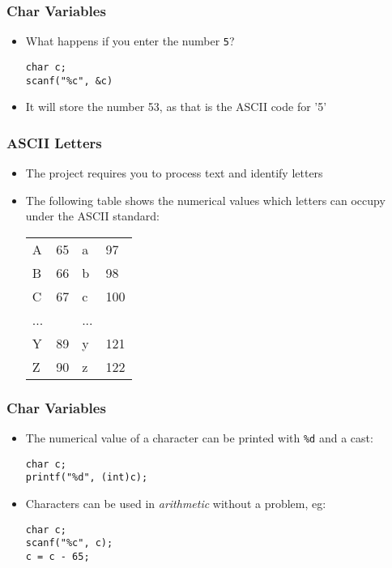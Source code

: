 \documentclass[14pt]{beamer}
\begin{document}
\begin{frame}[fragile]
\frametitle{Char Variables}
\begin{itemize}
\item What happens if you enter the number \texttt{5}?
\begin{lstlisting}[style=CStyle]
char c;
scanf("%c", &c)
\end{lstlisting}
\pause
\item It will store the number 53, as that is the ASCII code for '5'
\end{itemize}
\end{frame}

\begin{frame}
\frametitle{ASCII Letters}
\begin{itemize}
\item The project requires you to process text and identify letters
\item The following table shows the numerical values which letters can occupy under the ASCII standard:

\begin{table}[H]
\begin{center}
\begin{tabular}{ll|ll}
A & 65 & a & 97\\
B & 66 & b & 98\\
C & 67 & c & 100\\
... & & ... & \\
Y & 89 & y & 121\\
Z & 90 & z & 122
\end{tabular}
\end{center}
\end{table}
\end{itemize}
\end{frame}

\begin{frame}[fragile]
\frametitle{Char Variables}
\begin{itemize}
\item The numerical value of a character can be printed with \texttt{\%d} and a cast:
\begin{lstlisting}[style=CStyle]
char c;
printf("%d", (int)c);
\end{lstlisting}
\item Characters can be used in \textit{arithmetic} without a problem, eg:
\begin{lstlisting}[style=CStyle]
char c;
scanf("%c", c);
c = c - 65;
\end{lstlisting}
\pause

\end{itemize}
\end{frame}
\end{document}
